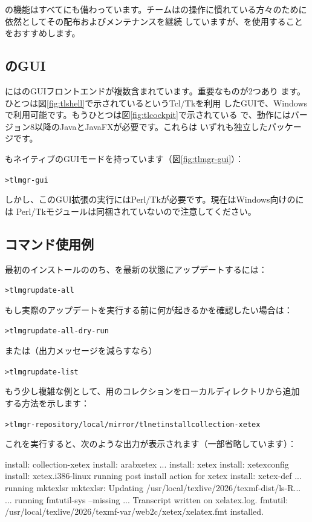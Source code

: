 \documentclass[uplatex,dvipdfmx,12pt,tombow]{jsarticle}
\begin{document}
の機能はすべてにも備わっています。\TL チームはの操作に慣れている方々のために依然としてその配布およびメンテナンスを継続
していますが、を使用することをおすすめします。

\subsection{のGUI}

\TL にはのGUIフロントエンドが複数含まれています。重要なものが2つあり
ます。ひとつは図\ref{fig:tlshell}で示されているというTcl/Tkを利用
したGUIで、Windowsで利用可能です。もうひとつは図\ref{fig:tlcockpit}で示されている
で、動作にはバージョン8以降のJavaとJavaFXが必要です。これらは
いずれも独立したパッケージです。

もネイティブのGUIモードを持っています（図\ref{fig:tlmgr-gui}）：
%
\begin{alltt}
> tlmgr -gui
\end{alltt}
%
しかし、このGUI拡張の実行にはPerl/Tkが必要です。現在はWindows向けの\TL には
Perl/Tkモジュールは同梱されていないので注意してください。

\subsection{コマンド使用例}

最初のインストールののち、\TL を最新の状態にアップデートするには：
%
\begin{alltt}
> tlmgr update -all
\end{alltt}
%
もし実際のアップデートを実行する前に何が起きるかを確認したい場合は：
%
\begin{alltt}
> tlmgr update -all -dry-run
\end{alltt}
%
または（出力メッセージを減らすなら）
%
\begin{alltt}
> tlmgr update -list
\end{alltt}

もう少し複雑な例として、\XeTeX 用のコレクションをローカルディレクトリから追加
する方法を示します：
%
\begin{alltt}
> tlmgr -repository /local/mirror/tlnet install collection-xetex
\end{alltt}
%
これを実行すると、次のような出力が表示されます（一部省略しています）：
%
\begin{fverbatim}
install: collection-xetex
install: arabxetex
...
install: xetex
install: xetexconfig
install: xetex.i386-linux
running post install action for xetex
install: xetex-def
...
running mktexlsr
mktexlsr: Updating /usr/local/texlive/2026/texmf-dist/ls-R...
...
running fmtutil-sys --missing
...
Transcript written on xelatex.log.
fmtutil: /usr/local/texlive/2026/texmf-var/web2c/xetex/xelatex.fmt installed.
\end{fverbatim}
\end{document}
